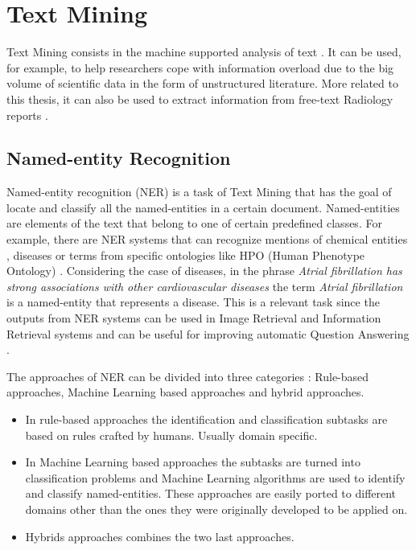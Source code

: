 \label{chap2}


\section{Text Mining}

Text Mining consists in the machine supported analysis of text \citep{Hotho2005}. It can be used, for example, to help researchers cope with information overload \citep{Cohen2005a} due to the big volume of scientific data in the form of unstructured literature. More related to this thesis, it can also be used to extract information from free-text Radiology reports \citep{Pons2016}.

\subsection{Named-entity Recognition}
\label{Named-entity Recognition}

Named-entity recognition (NER) is a task of Text Mining that has the goal of locate and classify all the named-entities in a certain document. Named-entities are elements of the text that belong to one of certain predefined classes. For example, there are NER systems that can recognize mentions of chemical entities \citep{Zhang2016}, diseases \citep{Wei2016} or terms from specific ontologies like HPO (Human Phenotype Ontology) \citep{Groza2015}. Considering the case of diseases, in the phrase \textit{Atrial fibrillation has strong associations with other cardiovascular diseases} the term \textit{Atrial fibrillation} is a named-entity that represents a disease. This is a relevant task since the outputs from NER systems can be used in Image Retrieval \citep{Gerstmair2012} and Information Retrieval \citep{Antony2015} systems and can be useful for improving automatic Question Answering \citep{Toral2005}.

The approaches of NER can be divided into three categories \citep{Mohit2014}: Rule-based approaches, Machine Learning based approaches and hybrid approaches.

\begin{itemize}
\item In rule-based approaches the identification and classification subtasks are based on rules crafted by humans. Usually domain specific.
\item In Machine Learning based approaches the subtasks are turned into classification problems and Machine Learning algorithms are used to identify and classify named-entities. These approaches are easily ported to different domains other than the ones they were originally developed to be applied on.
\item Hybrids approaches combines the two last approaches.
\end{itemize}

